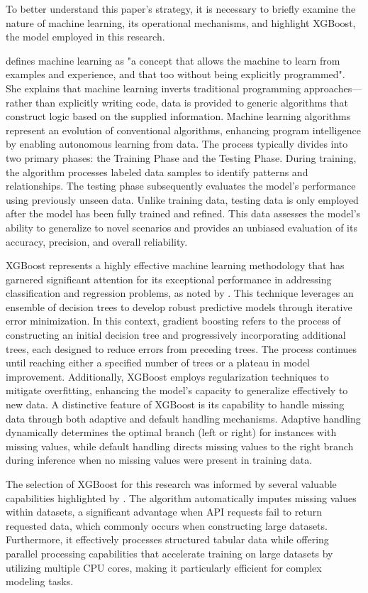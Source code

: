 To better understand this paper's strategy, it is necessary to briefly examine the nature of machine learning, its operational mechanisms, and highlight XGBoost, the model employed in this research.

\textcite{Johari2018MachineExamples} defines machine learning as "a concept that allows the machine to learn from examples and experience, and that too without being explicitly programmed". She explains that machine learning inverts traditional programming approaches—rather than explicitly writing code, data is provided to generic algorithms that construct logic based on the supplied information. Machine learning algorithms represent an evolution of conventional algorithms, enhancing program intelligence by enabling autonomous learning from data. The process typically divides into two primary phases: the Training Phase and the Testing Phase. During training, the algorithm processes labeled data samples to identify patterns and relationships. The testing phase subsequently evaluates the model's performance using previously unseen data. Unlike training data, testing data is only employed after the model has been fully trained and refined. This data assesses the model's ability to generalize to novel scenarios and provides an unbiased evaluation of its accuracy, precision, and overall reliability.

XGBoost represents a highly effective machine learning methodology that has garnered significant attention for its exceptional performance in addressing classification and regression problems, as noted by \textcite{Harrison2023EffectiveModels}. This technique leverages an ensemble of decision trees to develop robust predictive models through iterative error minimization. In this context, gradient boosting refers to the process of constructing an initial decision tree and progressively incorporating additional trees, each designed to reduce errors from preceding trees. The process continues until reaching either a specified number of trees or a plateau in model improvement. Additionally, XGBoost employs regularization techniques to mitigate overfitting, enhancing the model's capacity to generalize effectively to new data. A distinctive feature of XGBoost is its capability to handle missing data through both adaptive and default handling mechanisms. Adaptive handling dynamically determines the optimal branch (left or right) for instances with missing values, while default handling directs missing values to the right branch during inference when no missing values were present in training data.

The selection of XGBoost for this research was informed by several valuable capabilities highlighted by \textcite{Harrison2023EffectiveModels}. The algorithm automatically imputes missing values within datasets, a significant advantage when API requests fail to return requested data, which commonly occurs when constructing large datasets. Furthermore, it effectively processes structured tabular data while offering parallel processing capabilities that accelerate training on large datasets by utilizing multiple CPU cores, making it particularly efficient for complex modeling tasks.